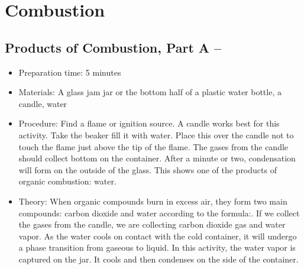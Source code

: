 \section{Combustion}

\subsection{Products of Combustion, Part A – \texorpdfstring{}{H2O}}
\begin{itemize}
\item{Preparation time: 5 minutes}
\item{Materials: A glass jam jar or the bottom half of a plastic water bottle, a candle, water}
\item{Procedure: Find a flame or ignition source. A candle works best for this activity. Take the beaker fill it with water. Place this over the candle not to touch the flame just above the tip of the flame. The gases from the candle should collect bottom on the container. After a minute or two, condensation will form on the outside of the glass. This shows one of the products of organic combustion: water.}
\item{Theory: When organic compounds burn in excess air, they form two main compounds: carbon dioxide and water according to the formula:. If we collect the gases from the candle, we are collecting carbon dioxide gas and water vapor. As the water cools on contact with the cold container, it will undergo a phase transition from gaseous to liquid. In this activity, the water vapor is captured on the jar. It cools and then condenses on the side of the container.}
\end{itemize}

